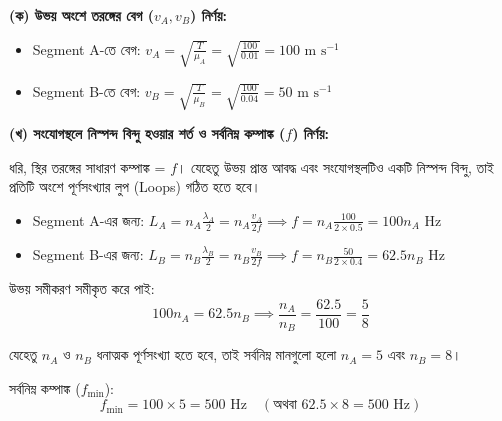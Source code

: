 \documentclass[12pt, a4paper]{article}
\begin{document}
\begin{tcolorbox}[solutionbox={সমাধান (Solution)}]
\noindent
\textbf{(ক) উভয় অংশে তরঙ্গের বেগ ($v_A, v_B$) নির্ণয়:}

\begin{itemize}[leftmargin=2em, itemsep=0.3em]
    \item Segment A-তে বেগ: $v_A = \sqrt{\frac{T}{\mu_A}} = \sqrt{\frac{100}{0.01}} = 100\text{ m s}^{-1}$
    \item Segment B-তে বেগ: $v_B = \sqrt{\frac{T}{\mu_B}} = \sqrt{\frac{100}{0.04}} = 50\text{ m s}^{-1}$
\end{itemize}

\vspace{1em}
\noindent
\textbf{(খ) সংযোগস্থলে নিস্পন্দ বিন্দু হওয়ার শর্ত ও সর্বনিম্ন কম্পাঙ্ক ($f$) নির্ণয়:}

\vspace{0.3em}
\noindent
ধরি, স্থির তরঙ্গের সাধারণ কম্পাঙ্ক = $f$। যেহেতু উভয় প্রান্ত আবদ্ধ এবং সংযোগস্থলটিও একটি নিস্পন্দ বিন্দু, তাই প্রতিটি অংশে পূর্ণসংখ্যার লুপ (Loops) গঠিত হতে হবে।
\begin{itemize}[leftmargin=2em, itemsep=0.3em]
    \item Segment A-এর জন্য: $L_A = n_A \frac{\lambda_A}{2} = n_A \frac{v_A}{2f} \implies f = n_A \frac{100}{2 \times 0.5} = 100 n_A\text{ Hz}$
    \item Segment B-এর জন্য: $L_B = n_B \frac{\lambda_B}{2} = n_B \frac{v_B}{2f} \implies f = n_B \frac{50}{2 \times 0.4} = 62.5 n_B\text{ Hz}$
\end{itemize}

\vspace{0.3em}
\noindent
উভয় সমীকরণ সমীকৃত করে পাই:
\[ 100 n_A = 62.5 n_B \implies \frac{n_A}{n_B} = \frac{62.5}{100} = \frac{5}{8} \]

\noindent
যেহেতু $n_A$ ও $n_B$ ধনাত্মক পূর্ণসংখ্যা হতে হবে, তাই সর্বনিম্ন মানগুলো হলো $n_A = 5$ এবং $n_B = 8$।
\par\noindent
সর্বনিম্ন কম্পাঙ্ক ($f_{\min}$):
\[ f_{\min} = 100 \times 5 = 500\text{ Hz} \quad (\text{অথবা } 62.5 \times 8 = 500\text{ Hz}) \]

\vspace{1.2em}
\begin{center}
\end{center}
\end{tcolorbox}
\end{document}
